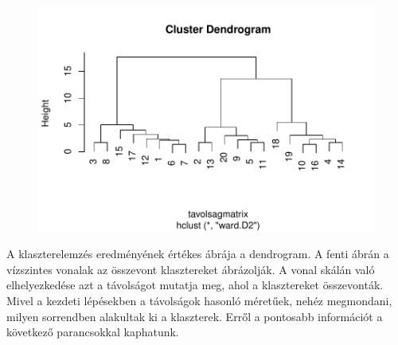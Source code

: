 \documentclass[
  letterpaper,
]{krantz}
\begin{document}
\begin{figure}[H]

{\centering \includegraphics{./sec_klaszter_files/figure-pdf/unnamed-chunk-4-1.pdf}

}

\end{figure}

A klaszterelemzés eredményének értékes ábrája a dendrogram. A fenti
ábrán a vízszintes vonalak az összevont klasztereket ábrázolják. A vonal
skálán való elhelyezkedése azt a távolságot mutatja meg, ahol a
klasztereket összevonták. Mivel a kezdeti lépésekben a távolságok
hasonló méretűek, nehéz megmondani, milyen sorrendben alakultak ki a
klaszterek. Erről a pontosabb információt a következő parancsokkal
kaphatunk.
\end{document}
